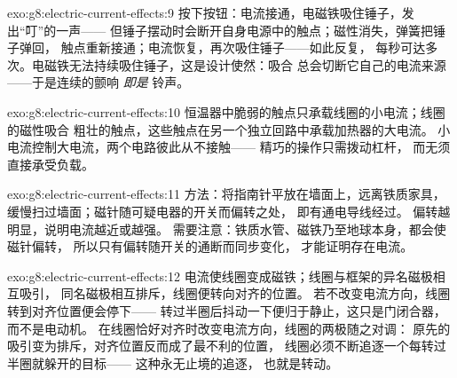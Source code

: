 \begin{solution}{exo:g8:electric-current-effects:9}
按下按钮：电流接通，电磁铁吸住锤子，发出“叮”的一声——
但锤子摆动时会断开自身电源中的触点；磁性消失，弹簧把锤子弹回，
触点重新接通；电流恢复，再次吸住锤子——如此反复，
每秒可达多次。电磁铁无法持续吸住锤子，这是设计使然：吸合
总会切断它自己的电流来源——于是连续的颤响
\emph{即是}
铃声。
\end{solution}

\begin{solution}{exo:g8:electric-current-effects:10}
恒温器中脆弱的触点只承载线圈的小电流；线圈的磁性吸合
粗壮的触点，这些触点在另一个独立回路中承载加热器的大电流。
小电流控制大电流，两个电路彼此从不接触——
精巧的操作只需拨动杠杆，
而无须直接承受负载。
\end{solution}

\begin{solution}{exo:g8:electric-current-effects:11}
方法：将指南针平放在墙面上，远离铁质家具，
缓慢扫过墙面；磁针随可疑电器的开关而偏转之处，
即有通电导线经过。
偏转越明显，说明电流越近或越强。
需要注意：铁质水管、磁铁乃至地球本身，都会使磁针偏转，
所以只有偏转随开关的通断而同步变化，
才能证明存在电流。
\end{solution}

\begin{solution}{exo:g8:electric-current-effects:12}
电流使线圈变成磁铁；线圈与框架的异名磁极相互吸引，
同名磁极相互排斥，线圈便转向对齐的位置。
若不改变电流方向，线圈转到对齐位置便会停下——
转过半圈后抖动一下便归于静止，这只是门闭合器，而不是电动机。
在线圈恰好对齐时改变电流方向，线圈的两极随之对调：
原先的吸引变为排斥，对齐位置反而成了最不利的位置，
线圈必须不断追逐一个每转过半圈就躲开的目标——
这种永无止境的追逐，
也就是转动。
\end{solution}

